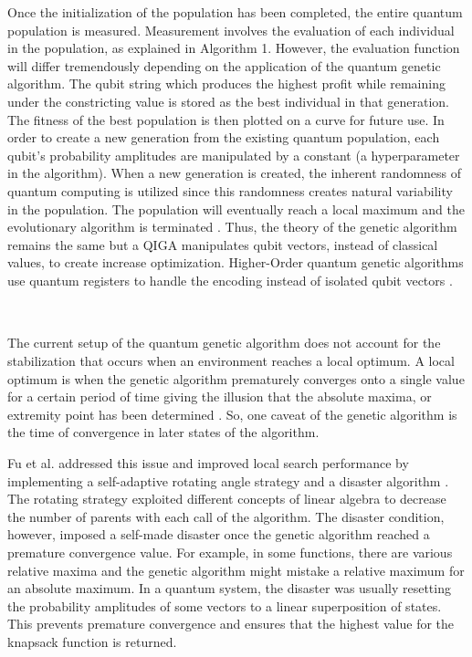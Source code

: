 Once the initialization of the population has been completed, the entire quantum population is measured. Measurement involves the evaluation of each individual in the population, as explained in Algorithm 1. However, the evaluation function will differ tremendously depending on the application of the quantum genetic algorithm. The qubit string which produces the highest profit while remaining under the constricting value is stored as the best individual in that generation. The fitness of the best population is then plotted on a curve for future use. In order to create a new generation from the existing quantum population, each qubit’s probability amplitudes are manipulated by a constant (a hyperparameter in the algorithm). When a new generation is created, the inherent randomness of quantum computing is utilized since this randomness creates natural variability in the population. The population will eventually reach a local maximum and the evolutionary algorithm is terminated \cite{nowotniak_higher-order_2014}. Thus, the theory of the genetic algorithm remains the same but a QIGA manipulates qubit vectors, instead of classical values, to create increase optimization.  Higher-Order quantum genetic algorithms use quantum registers to handle the encoding instead of isolated qubit vectors \cite{nowotniak_higher-order_2014}.

\subsection*{\color{SubSectionBlue}{Disaster Algorithm}}
 \\

The current setup of the quantum genetic algorithm does not account for the stabilization that occurs when an environment reaches a local optimum. A local optimum is when the genetic algorithm prematurely converges onto a single value for a certain period of time giving the illusion that the absolute maxima, or extremity point has been determined \cite{nowotniak_higher-order_2014}. So, one caveat of the genetic algorithm is the time of convergence in later states of the algorithm. 

\vspace{1mm}

Fu et al. \cite{wu_improvement_2013} addressed this issue and improved local search performance by implementing a self-adaptive rotating angle strategy and a disaster algorithm \cite{wu_improvement_2013}.  The rotating strategy exploited different concepts of linear algebra to decrease the number of parents with each call of the algorithm. The disaster condition, however, imposed a self-made disaster once the genetic algorithm reached a premature convergence value. For example, in some functions, there are various relative maxima and the genetic algorithm might mistake a relative maximum for an absolute maximum. In a quantum system, the disaster was usually resetting the probability amplitudes of some vectors to a linear superposition of states. This prevents premature convergence and ensures that the highest value for the knapsack function is returned.


